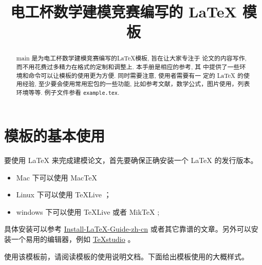 \documentclass[withoutpreface,bwprint]{main} %
\title{电工杯数学建模竞赛编写的 \LaTeX{} 模板}
\begin{document}
 \maketitle
 \begin{abstract}
main 是为电工杯数学建模竞赛编写的\LaTeX{}模板, 旨在让大家专注于 论文的内容写作, 而不用花费过多精力在格式的定制和调整上. 本手册是相应的参考, 其 中提供了一些环境和命令可以让模板的使用更为方便. 同时需要注意, 使用者需要有一 定的 \LaTeX{} 的使用经验, 至少要会使用常用宏包的一些功能, 比如参考文献，数学公式，图片使用，列表环境等等. 例子文件参看 \texttt{example.tex}.



\end{abstract}

\tableofcontents

\newpage

\section{模板的基本使用}

要使用 \LaTeX{} 来完成建模论文，首先要确保正确安装一个 \LaTeX{} 的发行版本。

\begin{itemize}
    \item Mac 下可以使用 Mac\TeX{}
    \item Linux 下可以使用 \TeX{}Live ；
    \item windows 下可以使用 \TeX{}Live 或者 Mik\TeX{} ;
\end{itemize}

具体安装可以参考 \href{https://github.com/OsbertWang/install-latex-guide-zh-cn/releases/}{Install-LaTeX-Guide-zh-cn} 或者其它靠谱的文章。另外可以安装一个易用的编辑器，例如 \href{https://mirrors.tuna.tsinghua.edu.cn/github-release/texstudio-org/texstudio/LatestRelease/}{\TeX{}studio} 。

使用该模板前，请阅读模板的使用说明文档。下面给出模板使用的大概样式。
\end{document}
